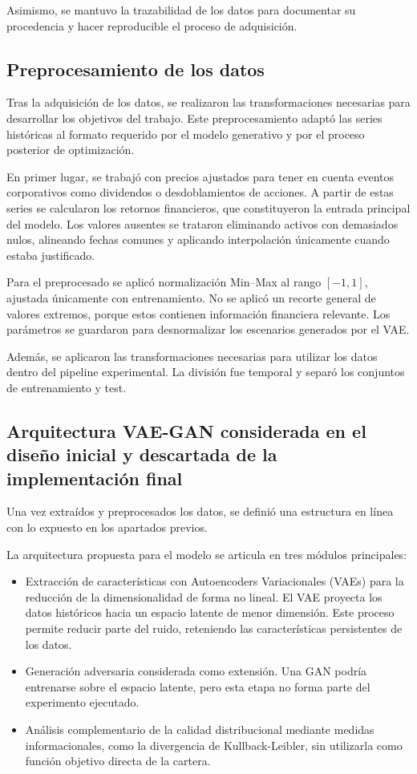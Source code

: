 Asimismo, se mantuvo la trazabilidad de los datos para documentar su procedencia y hacer reproducible el proceso de adquisición.

\subsection{Preprocesamiento de los datos}

Tras la adquisición de los datos, se realizaron las transformaciones necesarias para desarrollar los objetivos del trabajo. Este preprocesamiento adaptó las series históricas al formato requerido por el modelo generativo y por el proceso posterior de optimización.

En primer lugar, se trabajó con precios ajustados para tener en cuenta eventos corporativos como dividendos o desdoblamientos de acciones. A partir de estas series se calcularon los retornos financieros, que constituyeron la entrada principal del modelo. Los valores ausentes se trataron eliminando activos con demasiados nulos, alineando fechas comunes y aplicando interpolación únicamente cuando estaba justificado.

Para el preprocesado se aplicó normalización Min--Max al rango $[-1,1]$, ajustada únicamente con entrenamiento. No se aplicó un recorte general de valores extremos, porque estos contienen información financiera relevante. Los parámetros se guardaron para desnormalizar los escenarios generados por el VAE.

Además, se aplicaron las transformaciones necesarias para utilizar los datos dentro del pipeline experimental. La división fue temporal y separó los conjuntos de entrenamiento y test.

\subsection{Arquitectura VAE-GAN considerada en el diseño inicial y descartada de la implementación final}

Una vez extraídos y preprocesados los datos, se definió una estructura en línea con lo expuesto en los apartados previos.

La arquitectura propuesta para el modelo se articula en tres módulos principales:

\begin{itemize}
\item Extracción de características con Autoencoders Variacionales (VAEs) para la reducción de la dimensionalidad de forma no lineal. El VAE proyecta los datos históricos hacia un espacio latente de menor dimensión. Este proceso permite reducir parte del ruido, reteniendo las características persistentes de los datos.

\item Generación adversaria considerada como extensión. Una GAN podría entrenarse sobre el espacio latente, pero esta etapa no forma parte del experimento ejecutado.

\item Análisis complementario de la calidad distribucional mediante medidas informacionales, como la divergencia de Kullback-Leibler, sin utilizarla como función objetivo directa de la cartera.
\end{itemize}


